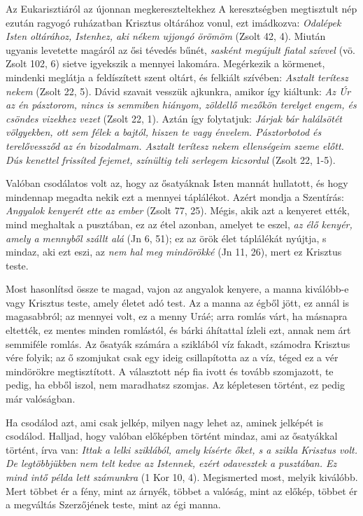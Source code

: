\documentclass[twoside]{article}
\begin{document}
\begin{lectio}{Az Eukarisztiáról az újonnan megkereszteltekhez}
\noindent A keresztségben megtisztult nép ezután ragyogó ruházatban Krisztus oltárához vonul, ezt imádkozva: \textit{Odalépek Isten oltárához, Istenhez, aki nékem ujjongó örömöm} (Zsolt 42, 4). Miután ugyanis levetette magáról az ősi tévedés bűnét, \textit{sasként megújult fiatal szívvel} (vö. Zsolt 102, 6) sietve igyekszik a mennyei lakomára. Megérkezik a körmenet, mindenki meglátja a feldíszített szent oltárt, és felkiált szívében: \textit{Asztalt terítesz nekem} (Zsolt 22, 5). Dávid szavait vesszük ajkunkra, amikor így kiáltunk: \textit{Az Úr az én pásztorom, nincs is semmiben hiányom, zöldellő mezőkön terelget engem, és csöndes vizekhez vezet} (Zsolt 22, 1). Aztán így folytatjuk: \textit{Járjak bár halálsötét völgyekben, ott sem félek a bajtól, hiszen te vagy énvelem. Pásztorbotod és terelővessződ az én bizodalmam. Asztalt terítesz nekem ellenségeim szeme előtt. Dús kenettel frissíted fejemet, színültig teli serlegem kicsordul} (Zsolt 22, 1-5).

Valóban csodálatos volt az, hogy az ősatyáknak Isten mannát hullatott, és hogy mindennap megadta nekik ezt a mennyei táplálékot. Azért mondja a Szentírás: \textit{Angyalok kenyerét ette az ember} (Zsolt 77, 25). Mégis, akik azt a kenyeret ették, mind meghaltak a pusztában, ez az étel azonban, amelyet te eszel, \textit{az élő kenyér, amely a mennyből szállt alá} (Jn 6, 51); ez az örök élet táplálékát nyújtja, s mindaz, aki ezt eszi, az \textit{nem hal meg mindörökké} (Jn 11, 26), mert ez Krisztus teste.

Most hasonlítsd össze te magad, vajon az angyalok kenyere, a manna kiválóbb-e vagy Krisztus teste, amely életet adó test. Az a manna az égből jött, ez annál is magasabbról; az mennyei volt, ez a menny Uráé; arra romlás várt, ha másnapra eltették, ez mentes minden romlástól, és bárki áhítattal ízleli ezt, annak nem árt semmiféle romlás. Az ősatyák számára a sziklából víz fakadt, számodra Krisztus vére folyik; az ő szomjukat csak egy ideig csillapította az a víz, téged ez a vér mindörökre megtisztított. A választott nép fia ivott és tovább szomjazott, te pedig, ha ebből iszol, nem maradhatsz szomjas. Az képletesen történt, ez pedig már valóságban.

Ha csodálod azt, ami csak jelkép, milyen nagy lehet az, aminek jelképét is csodálod. Halljad, hogy valóban előképben történt mindaz, ami az ősatyákkal történt, írva van: \textit{Ittak a lelki sziklából, amely kísérte őket, s a szikla Krisztus volt. De legtöbbjükben nem telt kedve az Istennek, ezért odavesztek a pusztában. Ez mind intő példa lett számunkra} (1 Kor 10, 4). Megismerted most, melyik kiválóbb. Mert többet ér a fény, mint az árnyék, többet a valóság, mint az előkép, többet ér a megváltás Szerzőjének teste, mint az égi manna.
\end{lectio}
\end{document}
